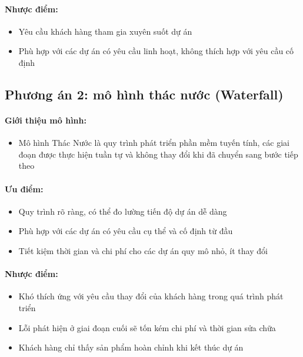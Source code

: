 \paragraph{Nhược điểm:}
\begin{itemize}
    \item Yêu cầu khách hàng tham gia xuyên suốt dự án
    \item Phù hợp với các dự án có yêu cầu linh hoạt, không thích hợp với yêu cầu cố định
\end{itemize}
\subsection{Phương án 2: mô hình thác nước (Waterfall)}
\paragraph{Giới thiệu mô hình:}
\begin{itemize}
    \item Mô hình Thác Nước là quy trình phát triển phần mềm tuyến tính, các giai đoạn được thực hiện tuần tự và không thay đổi khi đã chuyển sang bước tiếp theo
\end{itemize}
\paragraph{Ưu điểm:}
\begin{itemize}
    \item Quy trình rõ ràng, có thể đo lường tiến độ dự án dễ dàng
    \item Phù hợp với các dự án có yêu cầu cụ thể và cố định từ đầu
    \item Tiết kiệm thời gian và chi phí cho các dự án quy mô nhỏ, ít thay đổi
\end{itemize}
\paragraph{Nhược điểm:}
\begin{itemize}
    \item Khó thích ứng với yêu cầu thay đổi của khách hàng trong quá trình phát triển
    \item Lỗi phát hiện ở giai đoạn cuối sẽ tốn kém chi phí và thời gian sửa chữa
    \item Khách hàng chỉ thấy sản phẩm hoàn chỉnh khi kết thúc dự án
\end{itemize}
